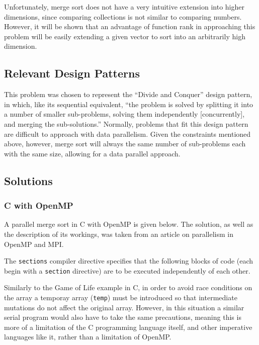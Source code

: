 Unfortunately, merge sort does not have a very intuitive extension into higher dimensions, 
since comparing collections is not similar to comparing numbers.
However, it will be shown that an advantage of function rank in approaching this problem
will be easily extending a given vector to sort into an arbitrarily high dimension.

\subsection{Relevant Design Patterns}
This problem was chosen to represent the ``Divide and Conquer'' design pattern, \cite{mass}
in which, like its sequential equivalent,
``the problem is solved by splitting it into a number of smaller sub-problems, 
solving them independently [concurrently], and merging the sub-solutions.''
Normally, problems that fit this design pattern are difficult to approach with data parallelism.
Given the constraints mentioned above, however,
merge sort will always the same number of sub-problems each with the same size, 
allowing for a data parallel approach.

\subsection{Solutions}
\subsubsection{C with OpenMP}
A parallel merge sort in C with OpenMP is given below.
The solution, as well as the description of its workings, 
was taken from an article on parallelism in OpenMP and MPI\cite{mergeomp}.

\begin{singlespacing}
\begin{small}

\end{small}
\end{singlespacing}

The \texttt{sections} compiler directive\cite{openmp}
specifies that the following blocks of code (each begin with a \texttt{section} directive) 
are to be executed independently of each other.

Similarly to the Game of Life example in C, 
in order to avoid race conditions on the array a temporay array (\texttt{temp}) must be introduced
so that intermediate mutations do not affect the original array.
However, in this situation a similar serial program would also have to take the same precautions, 
meaning this is more of a limitation of the C programming language itself, 
and other imperative languages like it, rather than a limitation of OpenMP.

